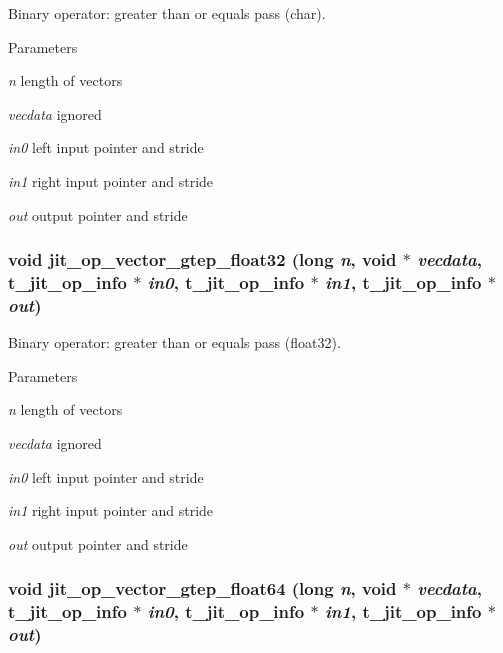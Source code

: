 Binary operator: greater than or equals pass (char). 
\begin{DoxyParams}{Parameters}
\item[{\em n}]length of vectors \item[{\em vecdata}]ignored \item[{\em in0}]left input pointer and stride \item[{\em in1}]right input pointer and stride \item[{\em out}]output pointer and stride \end{DoxyParams}
\hypertarget{group__opvecmod_ga898b59610da31b4e3e40545673c60400}{
\subsubsection[{jit\_\-op\_\-vector\_\-gtep\_\-float32}]{\setlength{\rightskip}{0pt plus 5cm}void jit\_\-op\_\-vector\_\-gtep\_\-float32 (long {\em n}, \/  void $\ast$ {\em vecdata}, \/  {\bf t\_\-jit\_\-op\_\-info} $\ast$ {\em in0}, \/  {\bf t\_\-jit\_\-op\_\-info} $\ast$ {\em in1}, \/  {\bf t\_\-jit\_\-op\_\-info} $\ast$ {\em out})}}
\label{group__opvecmod_ga898b59610da31b4e3e40545673c60400}


Binary operator: greater than or equals pass (float32). 
\begin{DoxyParams}{Parameters}
\item[{\em n}]length of vectors \item[{\em vecdata}]ignored \item[{\em in0}]left input pointer and stride \item[{\em in1}]right input pointer and stride \item[{\em out}]output pointer and stride \end{DoxyParams}
\hypertarget{group__opvecmod_gafd58aaa7408cc5522523e4779f3795b4}{
\subsubsection[{jit\_\-op\_\-vector\_\-gtep\_\-float64}]{\setlength{\rightskip}{0pt plus 5cm}void jit\_\-op\_\-vector\_\-gtep\_\-float64 (long {\em n}, \/  void $\ast$ {\em vecdata}, \/  {\bf t\_\-jit\_\-op\_\-info} $\ast$ {\em in0}, \/  {\bf t\_\-jit\_\-op\_\-info} $\ast$ {\em in1}, \/  {\bf t\_\-jit\_\-op\_\-info} $\ast$ {\em out})}}
\label{group__opvecmod_gafd58aaa7408cc5522523e4779f3795b4}


